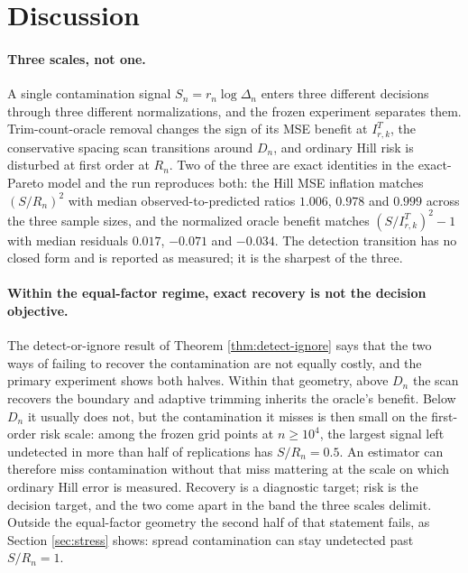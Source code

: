 \documentclass[11pt]{article}
\begin{document}
\FloatBarrier

\section{Discussion}
\label{sec:discussion}

\paragraph{Three scales, not one.}
A single contamination signal $S_n=r_n\log\Delta_n$ enters three different
decisions through three different normalizations, and the frozen experiment
separates them.  Trim-count-oracle removal changes the sign of its MSE benefit
at $I^{T}_{r,k}$, the conservative spacing scan transitions around $D_n$, and
ordinary
Hill risk is disturbed at first order at $R_n$.  Two of the three are exact
identities in the exact-Pareto model and the run reproduces both: the Hill MSE
inflation matches $(S/R_n)^2$ with median observed-to-predicted ratios $1.006$,
$0.978$ and $0.999$ across the three sample sizes, and the normalized oracle
benefit matches $(S/I^{T}_{r,k})^2-1$ with median residuals $0.017$, $-0.071$
and $-0.034$.  The detection transition has no closed form and is reported as
measured; it is the sharpest of the three.

\paragraph{Within the equal-factor regime, exact recovery is not the decision
objective.}
The detect-or-ignore result of Theorem \ref{thm:detect-ignore} says that the
two ways of failing to recover the contamination are not equally costly, and
the primary experiment shows both halves.  Within that geometry, above $D_n$
the scan recovers the boundary and adaptive trimming inherits the oracle's
benefit.  Below $D_n$ it usually does not, but the contamination it misses is
then small on the first-order risk scale: among the frozen grid points at
$n\ge10^4$, the largest signal left undetected in more than half of
replications has $S/R_n=0.5$.  An estimator can therefore miss contamination
without that miss mattering at the scale on which ordinary Hill error is
measured.  Recovery is a diagnostic target; risk is the decision target, and
the two come apart in the band the three scales delimit.  Outside the
equal-factor geometry the second half of that statement fails, as Section
\ref{sec:stress} shows: spread contamination can stay undetected past
$S/R_n=1$.
\end{document}
